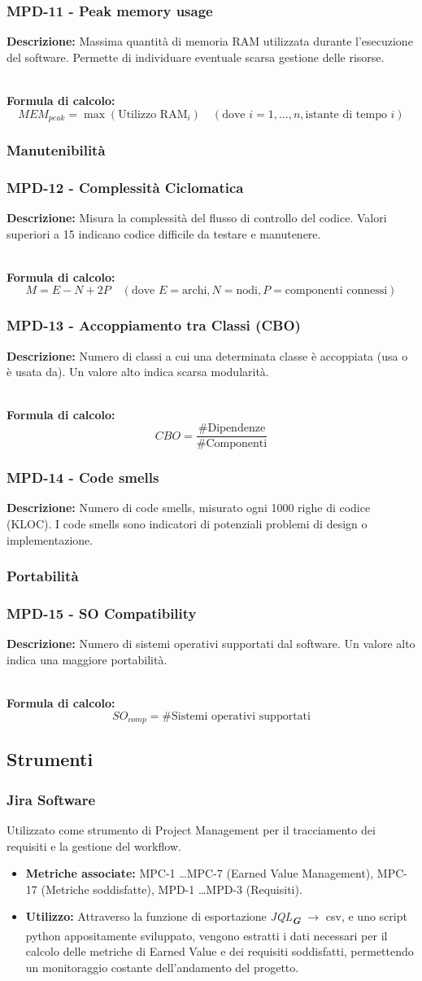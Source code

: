 \documentclass[a4paper,12pt]{article}
\newcommand{\glossario}[1]{\textit{#1}\textsubscript{\textbf{\textit{\textcolor{lightblack}{G}}}}}
\newcommand{\metricdef}[3]{
    \subsubsection*{#1 - #2}
    \textbf{Descrizione:} #3
}
\newcommand{\metricformula}[1]{
    \\[0.5em]
    \textbf{Formula di calcolo:}
    \begin{equation*}
        #1
    \end{equation*}
}
\begin{document}
\metricdef{MPD-11}{Peak memory usage}
{Massima quantità di memoria RAM utilizzata durante l'esecuzione del software. Permette di individuare eventuale scarsa gestione delle risorse.}
\metricformula{MEM_{peak} = \max(\text{Utilizzo RAM}_i) \quad (\text{dove }i = 1, \dots, n, \text{istante di tempo } i)}

\subsubsection{Manutenibilità}

\metricdef{MPD-12}{Complessità Ciclomatica}
{Misura la complessità del flusso di controllo del codice. Valori superiori a 15 indicano codice difficile da testare e manutenere.}
\metricformula{M = E - N + 2P \quad (\text{dove } E=\text{archi}, N=\text{nodi}, P=\text{componenti connessi})}

\metricdef{MPD-13}{Accoppiamento tra Classi (CBO)}
{Numero di classi a cui una determinata classe è accoppiata (usa o è usata da). Un valore alto indica scarsa modularità.}
\metricformula{CBO = \frac{\#\text{Dipendenze}}{\#\text{Componenti}}}

\metricdef{MPD-14}{Code smells}
{Numero di code smells, misurato ogni 1000 righe di codice (KLOC). I code smells sono indicatori di potenziali problemi di design o implementazione.}

\subsubsection{Portabilità}

\metricdef{MPD-15}{SO Compatibility}
{Numero di sistemi operativi supportati dal software. Un valore alto indica una maggiore portabilità.}
\metricformula{SO_{comp} = \#\text{Sistemi operativi supportati}}

\subsection{Strumenti}
\subsubsection{Jira Software}
Utilizzato come strumento di Project Management per il tracciamento dei
requisiti e la gestione del workflow.
\begin{itemize}
    \item \textbf{Metriche associate:} MPC-1 \dots MPC-7 (Earned Value Management), MPC-17 (Metriche soddisfatte), MPD-1 \dots MPD-3 (Requisiti).
    \item \textbf{Utilizzo:} Attraverso la funzione di esportazione \glossario{JQL} $\rightarrow$ csv, e uno script python appositamente sviluppato, vengono estratti i dati necessari per il calcolo delle metriche di Earned Value e dei requisiti soddisfatti, permettendo un monitoraggio costante dell'andamento del progetto.
\end{itemize}
\end{document}
